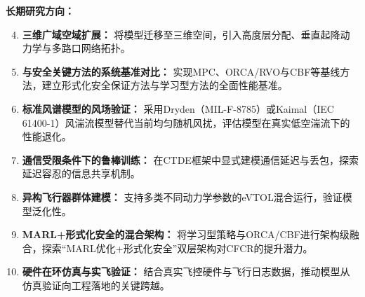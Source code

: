 \documentclass[12pt,a4paper,UTF8]{ctexart}
\begin{document}
\textbf{长期研究方向：}
\begin{enumerate}[label=(\arabic*)]
    \setcounter{enumi}{3}
    \item \textbf{三维广域空域扩展：} 将模型迁移至三维空间，引入高度层分配、垂直起降动力学与多路口网络拓扑。
    \item \textbf{与安全关键方法的系统基准对比：} 实现MPC、ORCA/RVO\cite{ref22}与CBF\cite{ref23}等基线方法，建立形式化安全保证方法与学习型方法的全面性能基准。
    \item \textbf{标准风谱模型的风场验证：} 采用Dryden（MIL-F-8785）或Kaimal（IEC 61400-1）风湍流模型替代当前均匀随机风扰，评估模型在真实低空湍流下的性能退化。
    \item \textbf{通信受限条件下的鲁棒训练：} 在CTDE框架中显式建模通信延迟与丢包，探索延迟容忍的信息共享机制。
    \item \textbf{异构飞行器群体建模：} 支持多类不同动力学参数的eVTOL混合运行，验证模型泛化性。
    \item \textbf{MARL+形式化安全的混合架构：} 将学习型策略与ORCA/CBF进行架构级融合，探索``MARL优化+形式化安全''双层架构对CFCR的提升潜力。
    \item \textbf{硬件在环仿真与实飞验证：} 结合真实飞控硬件与飞行日志数据，推动模型从仿真验证向工程落地的关键跨越。
\end{enumerate}
\end{document}
